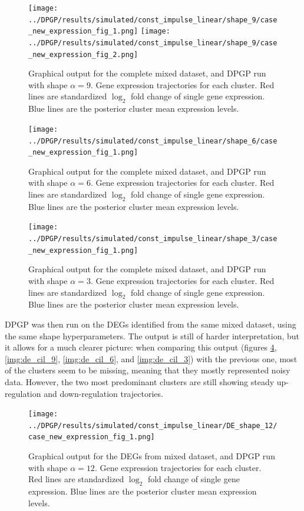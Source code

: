 \begin{figure}[!hp]
    \centering
    \texttt{[image: ../DPGP/results/simulated/const\_impulse\_linear/shape\_9/case\_new\_expression\_fig\_1.png]}
    \texttt{[image: ../DPGP/results/simulated/const\_impulse\_linear/shape\_9/case\_new\_expression\_fig\_2.png]}
    \caption[DPGP output for mixed dataset, shape 9]{Graphical output for the complete mixed dataset, and DPGP run with shape $\alpha=9$. Gene expression trajectories for each cluster. Red lines are standardized $\log_{2}$ fold change of single gene expression. Blue lines are the posterior cluster mean expression levels.}\label{img:cil_9}
\end{figure}

\begin{figure}[!hp]
    \centering
    \texttt{[image: ../DPGP/results/simulated/const\_impulse\_linear/shape\_6/case\_new\_expression\_fig\_1.png]}
    \caption[DPGP output for mixed dataset, shape 6]{Graphical output for the complete mixed dataset, and DPGP run with shape $\alpha=6$. Gene expression trajectories for each cluster. Red lines are standardized $\log_{2}$ fold change of single gene expression. Blue lines are the posterior cluster mean expression levels.}\label{img:cil_6}
\end{figure}

\begin{figure}[!hp]
    \centering
    \texttt{[image: ../DPGP/results/simulated/const\_impulse\_linear/shape\_3/case\_new\_expression\_fig\_1.png]}
    \caption[DPGP output for mixed dataset, shape 3]{Graphical output for the complete mixed dataset, and DPGP run with shape $\alpha=3$. Gene expression trajectories for each cluster. Red lines are standardized $\log_{2}$ fold change of single gene expression. Blue lines are the posterior cluster mean expression levels.}\label{img:cil_3}
\end{figure}

DPGP was then run on the DEGs identified from the same mixed dataset, using the same shape hyperparameters. The output is still of harder interpretation, but it allows for a much clearer picture: when comparing this output (figures \ref{img:de_cil_12}, \ref{img:de_cil_9}, \ref{img:de_cil_6}, and \ref{img:de_cil_3}) with the previous one, most of the clusters seem to be missing, meaning that they mostly represented noisy data. However, the two most predominant clusters are still showing steady up-regulation and down-regulation trajectories. 

\begin{figure}[!hp]
    \centering
    \texttt{[image: ../DPGP/results/simulated/const\_impulse\_linear/DE\_shape\_12/case\_new\_expression\_fig\_1.png]}
    \caption[DPGP output for DEG mixed dataset, shape 12]{Graphical output for the DEGs from mixed dataset, and DPGP run with shape $\alpha=12$. Gene expression trajectories for each cluster. Red lines are standardized $\log_{2}$ fold change of single gene expression. Blue lines are the posterior cluster mean expression levels.}\label{img:de_cil_12}
\end{figure}

